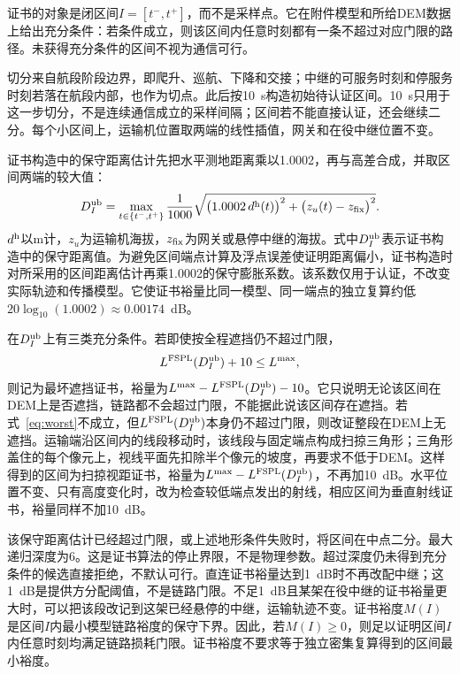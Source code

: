 证书的对象是闭区间$I=[t^-,t^+]$，而不是采样点。它在附件模型和所给DEM数据上给出充分条件：若条件成立，则该区间内任意时刻都有一条不超过对应门限的路径。未获得充分条件的区间不视为通信可行。

切分来自航段阶段边界，即爬升、巡航、下降和交接；中继的可服务时刻和停服务时刻若落在航段内部，也作为切点。此后按10~s构造初始待认证区间。10~s只用于这一步切分，不是连续通信成立的采样间隔；区间若不能直接认证，还会继续二分。每个小区间上，运输机位置取两端的线性插值，网关和在役中继位置不变。

证书构造中的保守距离估计先把水平测地距离乘以1.0002，再与高差合成，并取区间两端的较大值：
\begin{equation}
D_I^{\rm ub}
=\max_{t\in\{t^-,t^+\}}
\frac{1}{1000}\sqrt{\bigl(1.0002\,d^{\rm h}(t)\bigr)^2+\bigl(z_u(t)-z_{\rm fix}\bigr)^2}.
\label{eq:dub}
\end{equation}
$d^{\rm h}$以m计，$z_u$为运输机海拔，$z_{\rm fix}$为网关或悬停中继的海拔。式中$D_I^{\rm ub}$表示证书构造中的保守距离值。为避免区间端点计算及浮点误差使证明距离偏小，证书构造时对所采用的区间距离估计再乘1.0002的保守膨胀系数。该系数仅用于认证，不改变实际轨迹和传播模型。它使证书裕量比同一模型、同一端点的独立复算约低$20\log_{10}(1.0002)\approx0.00174$~dB。

在$D_I^{\rm ub}$上有三类充分条件。若即使按全程遮挡仍不超过门限，
\begin{equation}
L^{\rm FSPL}(D_I^{\rm ub})+10\le L^{\max},
\label{eq:worst}
\end{equation}
则记为最坏遮挡证书，裕量为$L^{\max}-L^{\rm FSPL}(D_I^{\rm ub})-10$。它只说明无论该区间在DEM上是否遮挡，链路都不会超过门限，不能据此说该区间存在遮挡。若式~\eqref{eq:worst}不成立，但$L^{\rm FSPL}(D_I^{\rm ub})$本身仍不超过门限，则改证整段在DEM上无遮挡。运输端沿区间内的线段移动时，该线段与固定端点构成扫掠三角形；三角形盖住的每个像元上，视线平面先扣除半个像元的坡度，再要求不低于DEM。这样得到的区间为扫掠视距证书，裕量为$L^{\max}-L^{\rm FSPL}(D_I^{\rm ub})$，不再加10~dB。水平位置不变、只有高度变化时，改为检查较低端点发出的射线，相应区间为垂直射线证书，裕量同样不加10~dB。

该保守距离估计已经超过门限，或上述地形条件失败时，将区间在中点二分。最大递归深度为6。这是证书算法的停止界限，不是物理参数。超过深度仍未得到充分条件的候选直接拒绝，不默认可行。直连证书裕量达到1~dB时不再改配中继；这1~dB是提供方分配阈值，不是链路门限。不足1~dB且某架在役中继的证书裕量更大时，可以把该段改记到这架已经悬停的中继，运输轨迹不变。证书裕度$M(I)$是区间$I$内最小模型链路裕度的保守下界。因此，若$M(I)\ge 0$，则足以证明区间$I$内任意时刻均满足链路损耗门限。证书裕度不要求等于独立密集复算得到的区间最小裕度。

